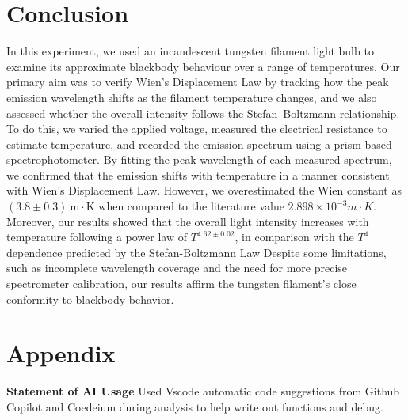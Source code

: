\documentclass[
	a4paper, %
	10pt, %
	twoside, %
]{journal}
\begin{document}
\section{Conclusion}
In this experiment, we used an incandescent tungsten filament light bulb to examine its approximate blackbody behaviour over a range of temperatures. Our primary aim was to verify Wien’s Displacement Law by tracking how the peak emission wavelength shifts as the filament temperature changes, and we also assessed whether the overall intensity follows the Stefan–Boltzmann relationship. To do this, we varied the applied voltage, measured the electrical resistance to estimate temperature, and recorded the emission spectrum using a prism-based spectrophotometer. By fitting the peak wavelength of each  measured spectrum, we confirmed that the emission shifts with temperature in a manner consistent with Wien's Displacement Law. However, we overestimated the Wien constant as $(3.8 \pm 0.3)~\mathrm{m\cdot K}$ when compared to the literature value $2.898 \times 10^{-3}\unit{m \cdot K}$. Moreover, our results showed that the overall light intensity increases with temperature following a power law of $T^{4.62 \pm 0.02}$, in comparison with the $T^{4}$ dependence predicted by the Stefan-Boltzmann Law  Despite some limitations, such as incomplete wavelength coverage and the need for more precise spectrometer calibration, our results affirm the tungsten filament’s close conformity to blackbody behavior.





\printbibliography %



\newpage

\appendix
\section*{Appendix}
\renewcommand{\thesubsection}{\Roman{subsection}}
\textbf{Statement of AI Usage} Used Vscode automatic code suggestions from Github Copilot and Coedeium during analysis to help write out functions and debug. 
\end{document}
